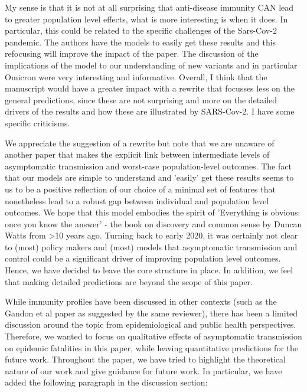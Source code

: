 \documentclass[12pt]{article}
\newcommand{\revtext}{\textsf}
\begin{document}
\revtext{My sense is that it is not at all surprising that anti-disease immunity CAN lead to greater population level effects, what is more interesting is when it does. In particular, this could be related to the specific challenges of the Sars-Cov-2 pandemic. The authors have the models to easily get these results and this refocusing will improve the impact of the paper. The discussion of the implications of the model to our understanding of new variants and in particular Omicron were very interesting and informative. Overall, I think that the manuscript would have a greater impact with a rewrite that focusses less on the general predictions, since these are not surprising and more on the detailed drivers of the results and how these are illustrated by SARS-Cov-2. I have some specific criticisms.}

We appreciate the suggestion of a rewrite but note that we are unaware of another paper that makes the explicit link between intermediate levels of asymptomatic transmission and worst-case population-level outcomes.  
The fact that our models are simple to understand and 'easily' get these results seems to us to be a positive reflection of our choice of a minimal set of features that nonetheless lead to a robust gap between individual and population level outcomes.  
We hope that this model embodies the spirit of 'Everything is obvious: once you know the answer' - the book on discovery and common sense by Duncan Watts from >10 years ago. 
Turning back to early 2020, it was certainly not clear to (most) policy makers and (most) models that asymptomatic transmission and control could be a significant driver of improving population level outcomes.  
Hence, we have decided to leave the core structure in place. 
In addition, we feel that making detailed predictions are beyond the scope of this paper. 

While immunity profiles have been discussed in other contexts (such as the Gandon et al paper as suggested by the same reviewer), there has been a limited discussion around the topic from epidemiological and public health perspectives.
Therefore, we wanted to focus on qualitative effects of asymptomatic transmission on epidemic fatalities in this paper, while leaving quantitative predictions for the future work.
Throughout the paper, we have tried to highlight the theoretical nature of our work and give guidance for future work.
In particular, we have added the following paragraph in the discussion section:
\end{document}
